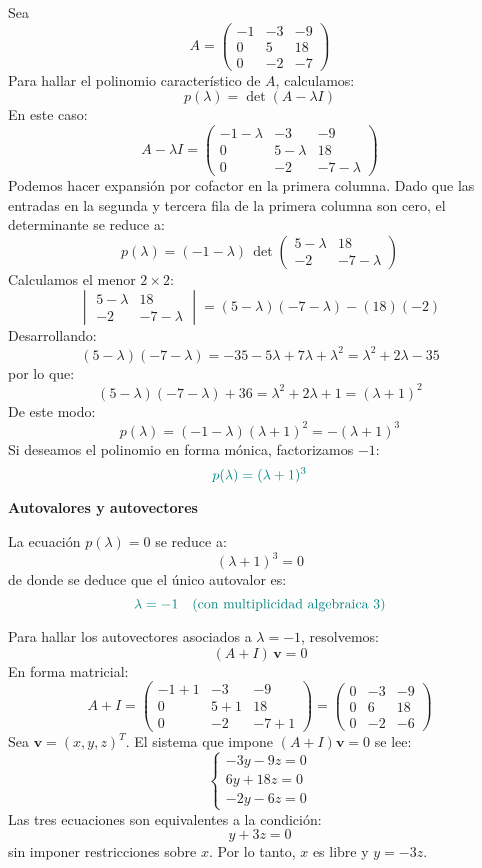 \documentclass{article}
\begin{document}
\begin{enumerate}[label=\textbf{\alph*)}]
Sea
\[
A =
\begin{pmatrix}
-1 & -3 & -9\\
0 & 5 & 18\\
0 & -2 & -7
\end{pmatrix}
\]
Para hallar el polinomio característico de \(A\), calculamos:
\[
p(\lambda) = \det(A - \lambda I)
\]
En este caso:
\[
A - \lambda I =
\begin{pmatrix}
-1-\lambda & -3 & -9\\
0 & 5-\lambda & 18\\
0 & -2 & -7-\lambda
\end{pmatrix}
\]
Podemos hacer expansión por cofactor en la primera columna.  
Dado que las entradas en la segunda y tercera fila de la primera columna son cero, el determinante se reduce a:
\[
p(\lambda) = (-1-\lambda)\,\det\begin{pmatrix}
5-\lambda & 18\\
-2 & -7-\lambda
\end{pmatrix}
\]
Calculamos el menor \(2\times 2\):
\[
\begin{vmatrix}
5-\lambda & 18\\
-2 & -7-\lambda
\end{vmatrix}
= (5-\lambda)(-7-\lambda) - (18)(-2)
\]
Desarrollando:
\[
(5-\lambda)(-7-\lambda)
= -35 -5\lambda +7\lambda + \lambda^2
= \lambda^2 + 2\lambda - 35
\]
por lo que:
\[
(5-\lambda)(-7-\lambda) + 36 = \lambda^2 + 2\lambda + 1 = (\lambda+1)^2
\]
De este modo:
\[
p(\lambda) = (-1-\lambda)(\lambda+1)^2 = -(\lambda+1)^3
\]
Si deseamos el polinomio en forma mónica, factorizamos \(-1\):
\[
\color{teal}
p(\lambda) = (\lambda+1)^3
\]

\textbf{Autovalores y autovectores}

La ecuación \(p(\lambda) = 0\) se reduce a:
\[
(\lambda+1)^3 = 0
\]
de donde se deduce que el único autovalor es:
\[
\color{teal}
\lambda = -1
\quad\text{(con multiplicidad algebraica \(3\))}
\]

Para hallar los autovectores asociados a \(\lambda = -1\), resolvemos:
\[
(A + I)\,\mathbf{v} = 0
\]
En forma matricial:
\[
A + I =
\begin{pmatrix}
-1+1 & -3 & -9\\
0 & 5+1 & 18\\
0 & -2 & -7+1
\end{pmatrix}
=
\begin{pmatrix}
0 & -3 & -9\\
0 & 6 & 18\\
0 & -2 & -6
\end{pmatrix}
\]
Sea \(\mathbf{v} = (x, y, z)^T\). El sistema que impone \((A+I)\mathbf{v}=0\) se lee:
\[
\begin{cases}
-3y - 9z = 0\\[4pt]
6y + 18z = 0\\[4pt]
-2y - 6z = 0
\end{cases}
\]
Las tres ecuaciones son equivalentes a la condición:
\[
y + 3z = 0
\]
sin imponer restricciones sobre \(x\).  
Por lo tanto, \(x\) es libre y \(y = -3z\).


\end{enumerate}
\end{document}

